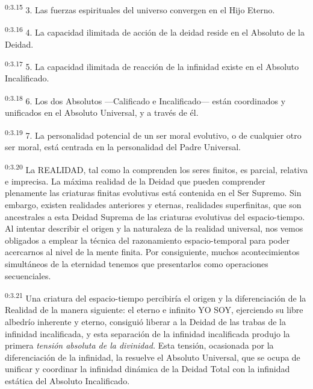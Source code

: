\par
\textsuperscript{0:3.15} 3. Las fuerzas espirituales del universo convergen en el Hijo Eterno.

\par
\textsuperscript{0:3.16} 4. La capacidad ilimitada de acción de la deidad reside en el Absoluto de la Deidad.

\par
\textsuperscript{0:3.17} 5. La capacidad ilimitada de reacción de la infinidad existe en el Absoluto Incalificado.

\par
\textsuperscript{0:3.18} 6. Los dos Absolutos ---Calificado e Incalificado--- están coordinados y unificados en el Absoluto Universal, y a través de él.

\par
\textsuperscript{0:3.19} 7. La personalidad potencial de un ser moral evolutivo, o de cualquier otro ser moral, está centrada en la personalidad del Padre Universal.

\par
\textsuperscript{0:3.20} La REALIDAD, tal como la comprenden los seres finitos, es parcial, relativa e imprecisa. La máxima realidad de la Deidad que pueden comprender plenamente las criaturas finitas evolutivas está contenida en el Ser Supremo. Sin embargo, existen realidades anteriores y eternas, realidades superfinitas, que son ancestrales a esta Deidad Suprema de las criaturas evolutivas del espacio-tiempo. Al intentar describir el origen y la naturaleza de la realidad universal, nos vemos obligados a emplear la técnica del razonamiento espacio-temporal para poder acercarnos al nivel de la mente finita. Por consiguiente, muchos acontecimientos simultáneos de la eternidad tenemos que presentarlos como operaciones secuenciales.

\par
\textsuperscript{0:3.21} Una criatura del espacio-tiempo percibiría el origen y la diferenciación de la Realidad de la manera siguiente: el eterno e infinito YO SOY, ejerciendo su libre albedrío inherente y eterno, consiguió liberar a la Deidad de las trabas de la infinidad incalificada, y esta separación de la infinidad incalificada produjo la primera \textit{tensión absoluta de la divinidad.} Esta tensión, ocasionada por la diferenciación de la infinidad, la resuelve el Absoluto Universal, que se ocupa de unificar y coordinar la infinidad dinámica de la Deidad Total con la infinidad estática del Absoluto Incalificado.

